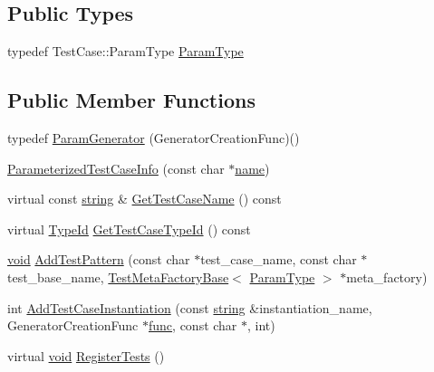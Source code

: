 \subsection*{Public Types}
\begin{DoxyCompactItemize}
\item 
typedef Test\-Case\-::\-Param\-Type \hyperlink{classtesting_1_1internal_1_1ParameterizedTestCaseInfo_a643a87e178bf92a4246ce21054e44b96}{Param\-Type}
\end{DoxyCompactItemize}
\subsection*{Public Member Functions}
\begin{DoxyCompactItemize}
\item 
typedef \hyperlink{classtesting_1_1internal_1_1ParameterizedTestCaseInfo_a2f6a423f7ae8c7ac24b468538693aa26}{Param\-Generator} (Generator\-Creation\-Func)()
\item 
\hyperlink{classtesting_1_1internal_1_1ParameterizedTestCaseInfo_a0a03ac9620ed8f0266f74ff774de9b71}{Parameterized\-Test\-Case\-Info} (const char $\ast$\hyperlink{core__c_8h_add928d8eb85ea33a25a67db3406d4887}{name})
\item 
virtual const \hyperlink{namespacetesting_1_1internal_a8e8ff5b11e64078831112677156cb111}{string} \& \hyperlink{classtesting_1_1internal_1_1ParameterizedTestCaseInfo_a6bb64ce694fcfaa9f95ba613552bcf80}{Get\-Test\-Case\-Name} () const 
\item 
virtual \hyperlink{namespacetesting_1_1internal_ab1114197d3c657d8b7f8e0c5caa12d00}{Type\-Id} \hyperlink{classtesting_1_1internal_1_1ParameterizedTestCaseInfo_a059b58d138d6e4c9bfaa020b1e5d9be2}{Get\-Test\-Case\-Type\-Id} () const 
\item 
\hyperlink{legacy_8hpp_a8bb47f092d473522721002c86c13b94e}{void} \hyperlink{classtesting_1_1internal_1_1ParameterizedTestCaseInfo_a3e557c888ec5e23b138c2ff254db15e5}{Add\-Test\-Pattern} (const char $\ast$test\-\_\-case\-\_\-name, const char $\ast$test\-\_\-base\-\_\-name, \hyperlink{classtesting_1_1internal_1_1TestMetaFactoryBase}{Test\-Meta\-Factory\-Base}$<$ \hyperlink{classtesting_1_1internal_1_1ParameterizedTestCaseInfo_a643a87e178bf92a4246ce21054e44b96}{Param\-Type} $>$ $\ast$meta\-\_\-factory)
\item 
int \hyperlink{classtesting_1_1internal_1_1ParameterizedTestCaseInfo_afa906b3f9fbc494ba13cf491abbc81fa}{Add\-Test\-Case\-Instantiation} (const \hyperlink{namespacetesting_1_1internal_a8e8ff5b11e64078831112677156cb111}{string} \&instantiation\-\_\-name, Generator\-Creation\-Func $\ast$\hyperlink{core__c_8h_a120677ac732b3c9bfecab149fc978afa}{func}, const char $\ast$, int)
\item 
virtual \hyperlink{legacy_8hpp_a8bb47f092d473522721002c86c13b94e}{void} \hyperlink{classtesting_1_1internal_1_1ParameterizedTestCaseInfo_a7e118820b3074ce70c0440e2e49a50a1}{Register\-Tests} ()
\end{DoxyCompactItemize}

